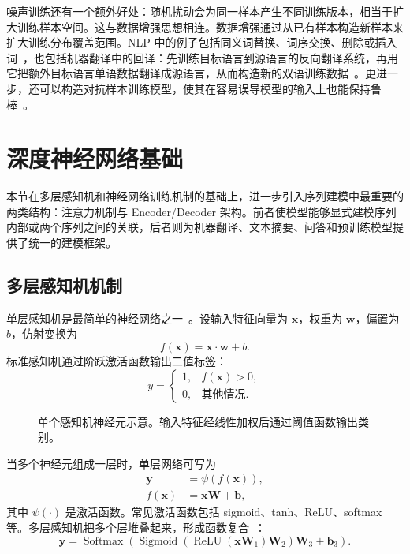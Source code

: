 噪声训练还有一个额外好处：随机扰动会为同一样本产生不同训练版本，相当于扩大训练样本空间。这与数据增强思想相连。数据增强通过从已有样本构造新样本来扩大训练分布覆盖范围。NLP 中的例子包括同义词替换、词序交换、删除或插入词~\cite{feng-etal:2021survey,shorten-Khoshgoftaar:2019survey}，也包括机器翻译中的回译：先训练目标语言到源语言的反向翻译系统，再用它把额外目标语言单语数据翻译成源语言，从而构造新的双语训练数据~\cite{sennrich-etal:2016improving}。更进一步，还可以构造对抗样本训练模型，使其在容易误导模型的输入上也能保持鲁棒~\cite{Szegedy-etal:2014neural,Goodfellow-etal:2015Adversarial}。

\section{深度神经网络基础}

本节在多层感知机和神经网络训练机制的基础上，进一步引入序列建模中最重要的两类结构：注意力机制与 Encoder/Decoder 架构。前者使模型能够显式建模序列内部或两个序列之间的关联，后者则为机器翻译、文本摘要、问答和预训练模型提供了统一的建模框架。

\subsection{多层感知机机制}

单层感知机是最简单的神经网络之一~\cite{Rosenblatt1958Perceptron}。设输入特征向量为 $\mathbf{x}$，权重为 $\mathbf{w}$，偏置为 $b$，仿射变换为
\begin{equation}
  f(\mathbf{x})=\mathbf{x}\cdot \mathbf{w}+b.
\end{equation}
标准感知机通过阶跃激活函数输出二值标签：
\begin{equation}
  y=
  \begin{cases}
    1, & f(\mathbf{x})>0,\\
    0, & \text{其他情况}.
  \end{cases}
\end{equation}


\begin{figure}[htbp]
  \centering
  
  \caption{单个感知机神经元示意。输入特征经线性加权后通过阈值函数输出类别。}
  \label{fig:nlpbook-perceptron-single-neuron}
\end{figure}

当多个神经元组成一层时，单层网络可写为
\begin{align}
  \mathbf{y} &= \psi(f(\mathbf{x})),\\
  f(\mathbf{x}) &= \mathbf{x}\mathbf{W}+\mathbf{b},
\end{align}
其中 $\psi(\cdot)$ 是激活函数。常见激活函数包括 sigmoid、tanh、ReLU、softmax 等。多层感知机把多个层堆叠起来，形成函数复合~\cite{RumelhartEtAl1986Backprop,GoodfellowEtAl2016DeepLearning}：
\begin{equation}
  \mathbf{y}
  =
  \operatorname{Softmax}
  \left(
    \operatorname{Sigmoid}
    \left(
      \operatorname{ReLU}(\mathbf{x}\mathbf{W}_1)\mathbf{W}_2
    \right)
    \mathbf{W}_3+\mathbf{b}_3
  \right).
\end{equation}

